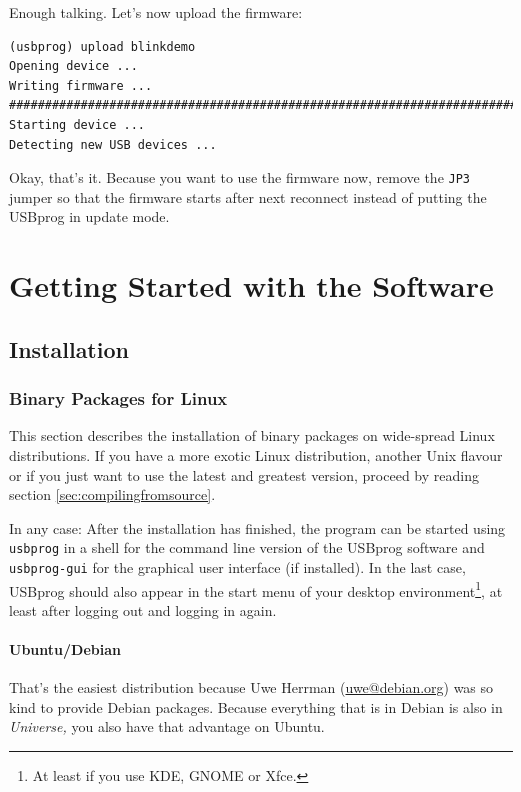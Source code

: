 \documentclass[bibtotoc,UKenglish,halfparskip,oneside,DIV12]{scrreprt}
\begin{document}
Enough talking. Let's now upload the firmware:

\begin{lstlisting}[style=inline]
(usbprog) upload blinkdemo
Opening device ...
Writing firmware ...
###############################################################################
Starting device ...
Detecting new USB devices ...
\end{lstlisting}

Okay, that's it. Because you want to use the firmware now, remove the \texttt{JP3} jumper so that
the firmware starts after next reconnect instead of putting the USBprog in update mode.

\chapter{Getting Started with the Software}

\section{Installation}
\label{sec:installation}

\subsection{Binary Packages for Linux}

This section describes the installation of binary packages on wide-spread Linux distributions. If
you have a more exotic Linux distribution, another Unix flavour or if you just want to use the
latest and greatest version, proceed by reading section \vref{sec:compilingfromsource}.

In any case: After the installation has finished, the program can be started using \texttt{usbprog}
in a shell for the command line version of the USBprog software and \texttt{usbprog-gui} for the
graphical user interface (if installed). In the last case, USBprog should also appear in the start
menu of your desktop environment\footnote{At least if you use KDE, GNOME or Xfce.}, at least after
logging out and logging in again.

\subsubsection{Ubuntu/Debian}

That's the easiest distribution because Uwe Herrman (\url{uwe@debian.org}) was so kind to provide
Debian packages. Because everything that is in Debian is also in \emph{Universe,} you also have that
advantage on Ubuntu.
\end{document}
